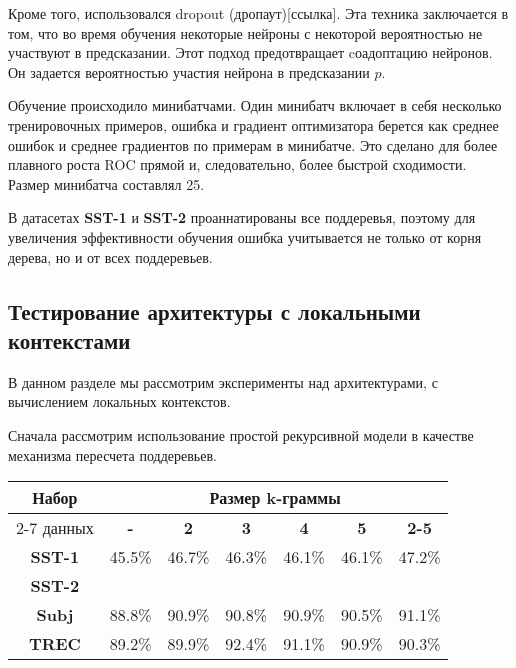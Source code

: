 Кроме того, использовался dropout (дропаут)[ссылка]. 
Эта техника заключается в том, что во время обучения некоторые нейроны с некоторой вероятностью не участвуют в предсказании.
Этот подход предотвращает cоадоптацию нейронов. Он задается вероятностью участия нейрона в предсказании $p$.

Обучение происходило минибатчами. Один минибатч включает в себя несколько тренировочных примеров, ошибка и градиент оптимизатора
берется как среднее ошибок и среднее градиентов по примерам в минибатче. Это сделано для более плавного роста ROC прямой и, следовательно, более быстрой сходимости. Размер минибатча составлял 25.

В датасетах \textbf{SST-1} и \textbf{SST-2} проаннатированы все поддеревья, 
поэтому для увеличения эффективности обучения ошибка учитывается не только от корня дерева, но и от всех поддеревьев.

\subsection{Тестирование архитектуры с локальными контекстами}
В данном разделе мы рассмотрим эксперименты над архитектурами, с вычислением локальных контекстов.

Сначала рассмотрим использование простой рекурсивной модели в качестве механизма пересчета поддеревьев.

\vspace{5mm}
\noindent \begin{minipage}{\linewidth}
 \label{tab:title} 
\begin{tabular}{|c|c|c|c|c|c|c|}
\hline
\multirow{2}{*}{Набор}   &                \multicolumn{6}{c|}{Размер k-граммы} \\ \cline{2-7} 
     данных              & \textbf{-}   &   \textbf{2} & \textbf{3} & \textbf{4} & \textbf{5} & \textbf{2-5} \\ \hline
\textbf{SST-1}           & 45.5\%       & 46.7\%       & 46.3\%     & 46.1\%     &  46.1\%    &  47.2\%  \\ \hline
\textbf{SST-2}           &              &              &            &            &            & \\ \hline
\textbf{Subj}            & 88.8\%       & 90.9\%       & 90.8\%     & 90.9\%     &  90.5\%    & 91.1\% \\ \hline
\textbf{TREC}            & 89.2\%       & 89.9\%       & 92.4\%     & 91.1\%     &  90.9\%    & 90.3\% \\ \hline
\end{tabular}
\end{minipage}
\vspace{5mm}

